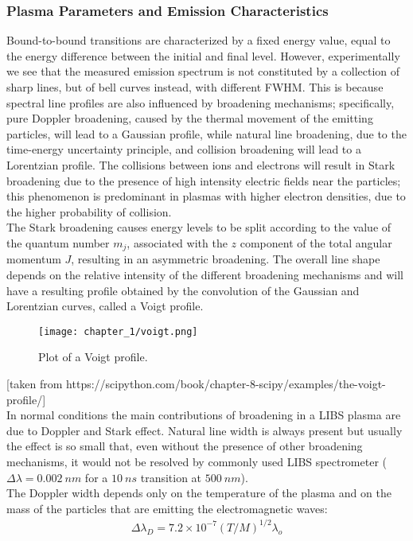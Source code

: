 \subsubsection{Plasma Parameters and Emission Characteristics}
\label{subsubsec:plasma_parameters}
Bound-to-bound transitions are characterized by a fixed energy value, equal to the energy difference between the initial and final level. However, experimentally we see that the measured emission spectrum is not constituted by a collection of sharp lines, but of bell curves instead, with different FWHM. This is because spectral line profiles are also influenced by broadening mechanisms; specifically, pure Doppler broadening, caused by the thermal movement of the emitting particles, will lead to a Gaussian profile, while natural line broadening, due to the time-energy uncertainty principle, and collision broadening will lead to a Lorentzian profile. The collisions between ions and electrons will result in Stark broadening due to the presence of high intensity electric fields near the particles; this phenomenon is predominant in plasmas with higher electron densities, due to the higher probability of collision. 
\\
The Stark broadening causes energy levels to be split according to the value of the quantum number $m_j$, associated with the $z$ component of the total angular momentum $J$, resulting in an asymmetric broadening.
The overall line shape depends on the relative intensity of the different broadening mechanisms and will have a resulting profile obtained by the convolution of the Gaussian and Lorentzian curves, called a Voigt profile.

\begin{figure}[H]
    \centering
    \texttt{[image: chapter\_1/voigt.png]}
    \caption{Plot of a Voigt profile.}
    \label{fig:voigt}
\end{figure}
[taken from https://scipython.com/book/chapter-8-scipy/examples/the-voigt-profile/]
\\
In normal conditions the main contributions of broadening in a LIBS plasma are due to Doppler and Stark effect. Natural line width is always present but usually the effect is so small that, even without the presence of other broadening mechanisms, it would not be resolved by commonly used LIBS spectrometer ($\Delta\lambda = 0.002\:nm$ for a $10\:ns$ transition at $500\:nm$).
\\
The Doppler width depends only on the temperature of the plasma and on the mass of the particles that are emitting the electromagnetic waves:
\begin{align}
    \Delta\lambda_{D}=7.2\times{10}^{-7}\left(T/M\right)^{1/2}\lambda_{o} \label{eq:doppler_eq}
\end{align}

